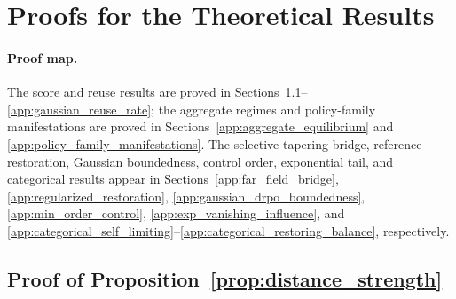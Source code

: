 \documentclass[sigconf,anonymous,review]{acmart}
\theoremstyle{acmdefinition}
\begin{document}





\appendix
\section{Proofs for the Theoretical Results}
\label{app:theory_proofs}

\paragraph{Proof map.}
The score and reuse results are proved in
Sections~\ref{app:distance_strength}--\ref{app:gaussian_reuse_rate}; the
aggregate regimes and policy-family manifestations are proved in
Sections~\ref{app:aggregate_equilibrium} and
\ref{app:policy_family_manifestations}. The selective-tapering bridge,
reference restoration, Gaussian boundedness, control order, exponential tail,
and categorical results appear in Sections~\ref{app:far_field_bridge},
\ref{app:regularized_restoration}, \ref{app:gaussian_drpo_boundedness},
\ref{app:min_order_control}, \ref{app:exp_vanishing_influence}, and
\ref{app:categorical_self_limiting}--\ref{app:categorical_restoring_balance},
respectively.

\subsection{Proof of Proposition~\ref{prop:distance_strength}}
\label{app:distance_strength}
\end{document}
